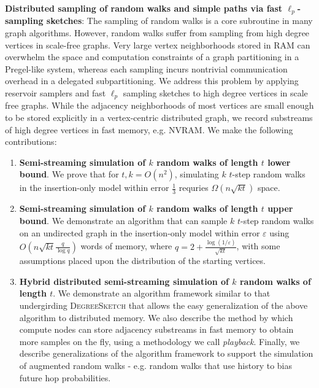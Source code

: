\documentclass[10]{article}
\newcommand{\algoname}[1]{\textnormal{\textsc{#1}}}
\begin{document}
\noindent
\textbf{Distributed sampling of random walks and simple paths via fast $\ell_p$-sampling sketches}:
The sampling of random walks is a core subroutine in many graph algorithms.
However, random walks suffer from sampling from high degree vertices in scale-free graphs. 
Very large vertex neighborhoods stored in RAM can overwhelm the space and computation constraints of a graph partitioning in a Pregel-like system, whereas each sampling incurs nontrivial communication overhead in a delegated subpartitioning. 
We address this problem by applying reservoir samplers and fast $\ell_p$ sampling sketches to high degree vertices in scale free graphs. 
While the adjacency neighborhoods of most vertices are small enough to be stored explicitly in a vertex-centric distributed graph, we record substreams of high degree vertices in fast memory, e.g. NVRAM. 
We make the following contributions:
%
\begin{enumerate}
	\item \textbf{Semi-streaming simulation of $k$ random walks of length $t$ lower bound}.
	We prove that for $t, k = O(n^2)$, simulating $k$ $t$-step random walks in the insertion-only model within error $\frac{1}{3}$ requries $\Omega(n\sqrt{kt})$ space.
	\item \textbf{Semi-streaming simulation of $k$ random walks of length $t$ upper bound}.
	We demonstrate an algorithm that can sample $k$ $t$-step random walks on an undirected graph in the insertion-only model within error $\varepsilon$  using $O \left ( n\sqrt{kt}\frac{q}{\log q} \right )$ words of memory, where $q = 2 + \frac{\log(1/\varepsilon)}{\sqrt{kt}}$, with some assumptions placed upon the distribution of the starting vertices.
	\item \textbf{Hybrid distributed semi-streaming simulation of $k$ random walks of length $t$}.
	We demonstrate an algorithm framework similar to that undergirding \algoname{DegreeSketch} that allows the easy generalization of the above algorithm to distributed memory. 
	We also describe the method by which compute nodes can store adjacency substreams in fast memory to obtain more samples on the fly, using a methodology we call \emph{playback}.
	Finally, we describe generalizations of the algorithm framework to support the simulation of augmented random walks - e.g. random walks that use history to bias future hop probabilities.
\end{enumerate}
%



\end{document}
